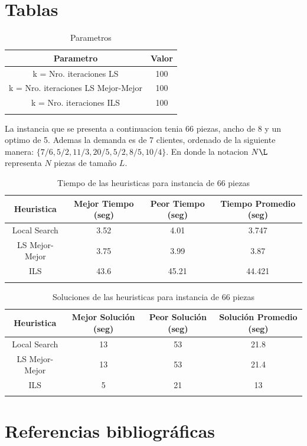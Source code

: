 \documentclass[letterpaper,11pt]{article}
\begin{document}
\section{Tablas}

\begin{longtable}{|c|c|}
\hline
Parametro & Valor \\
\hline
 k = Nro. iteraciones LS & 100 \\
\hline
 k = Nro. iteraciones LS Mejor-Mejor & 100 \\
\hline
 k = Nro. iteraciones ILS & 100 \\
\hline

\caption{Parametros}
\end{longtable}

La instancia que se presenta a continuacion tenia 66 piezas, ancho de 8 y un optimo de 5. Ademas la demanda es de
7 clientes, ordenado de la siguiente manera: $\lbrace 7/6, 5/2, 11/3, 20/5, 5/2, 8/5, 10/4\rbrace $. En donde la 
notacion $N\L$ representa $N$ piezas de tama\~no $L$.\\

\begin{longtable}{|c|c|c|c|}
\hline
Heuristica & Mejor Tiempo (seg) & Peor Tiempo (seg) & Tiempo Promedio (seg) \\
\hline
 Local Search & 3.52 & 4.01 & 3.747 \\
\hline
 LS Mejor-Mejor & 3.75 & 3.99 & 3.87 \\
\hline
 ILS & 43.6 & 45.21 & 44.421 \\
\hline

\caption{Tiempo de las heuristicas para instancia de 66 piezas}
\end{longtable}

\begin{longtable}{|c|c|c|c|}
\hline
Heuristica & Mejor Soluci\'on (seg) & Peor Soluci\'on (seg) & Soluci\'on Promedio (seg) \\
\hline
 Local Search & 13 & 53 & 21.8 \\
\hline
 LS Mejor-Mejor & 13 & 53 & 21.4 \\
\hline
 ILS & 5 & 21 & 13 \\
\hline

\caption{Soluciones de las heuristicas para instancia de 66 piezas}
\end{longtable}


\newpage

\section{Referencias bibliogr\'aficas}
\end{document}
